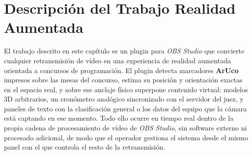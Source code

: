\chapter{Descripción del Trabajo Realidad Aumentada}
\label{cap:descripcionTrabajo}





El trabajo descrito en este capítulo es un plugin para \textit{OBS Studio} que convierte cualquier retransmisión de vídeo en una experiencia de realidad aumentada orientada a concursos de programación. El plugin detecta marcadores \textbf{ArUco} \citep{GarridoJurado2014} impresos sobre las mesas del concurso, estima su posición y orientación exactas en el espacio real, y sobre ese anclaje físico superpone contenido virtual: modelos 3D arbitrarios, un cronómetro analógico sincronizado con el servidor del juez, y paneles de texto con la clasificación general o los datos del equipo que la cámara está captando en ese momento. Todo ello ocurre en tiempo real dentro de la propia cadena de procesamiento de vídeo de \textit{OBS Studio}, sin software externo ni procesado adicional, de modo que el operador gestiona el sistema desde el mismo panel con el que controla el resto de la retransmisión.


